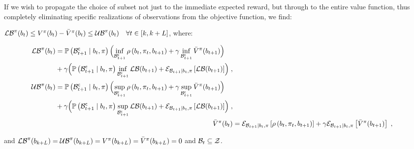If we wish to propagate the choice of subset not just to the immediate expected reward, but through to the entire value function, thus completely eliminating specific realizations of observations from the objective function, we find:
\begin{corollaryE}
	\label{thm:val_func_bounds_obs_bellman}
	$\lowerbound^\pi(\blf{t})\leq V^\pi(\blf{t})-\bar{V}^\pi(\blf{t})\leq\upperbound^\pi(\blf{t})\quad\forall t\in[k,k+L]$, where:
	\begin{small}
		\begin{subequations}
			\begin{align}
				\begin{split}
					\lowerbound\nolimits^\pi(\blf{t})&=\measure{\stcompI{\subSpace}{t+1}\mid\blf{t},\pi}\Bigl(\inf_{\stcompI{\subSpace}{t+1}}\reward{\blf{t},\pi_t,\blf{t+1}}+\gamma\inf_{\stcompI{\subSpace}{t+1}}\bar{V}^\pi(\blf{t+1})\Bigr)\\
					&+
					\gamma\Bigl(\measure{\stcompI{\subSpace}{t+1}\mid\blf{t},\pi}\inf_{\stcompI{\subSpace}{t+1}}\lowerbound(\blf{t+1})+\partialexpectation{\lowerbound(\blf{t+1})}{\subSpaceI{t+1}\mid\blf{t},\pi}\Bigr)\;,
				\end{split}\\
				\begin{split}
					\upperbound\nolimits^\pi(\blf{t})&=\measure{\stcompI{\subSpace}{t+1}\mid\blf{t},\pi}\Bigl(\sup_{\stcompI{\subSpace}{t+1}}\reward{\blf{t},\pi_t,\blf{t+1}}+\gamma\sup_{\stcompI{\subSpace}{t+1}}\bar{V}^\pi(\blf{t+1})\Bigr)\\
					&+
					\gamma\Bigl(\measure{\stcompI{\subSpace}{t+1}\mid\blf{t},\pi}\sup_{\stcompI{\subSpace}{t+1}}\lowerbound(\blf{t+1})+\partialexpectation{\lowerbound(\blf{t+1})}{\subSpaceI{t+1}\mid\blf{t},\pi}\Bigr)\;,
				\end{split}\\
				\bar{V}^\pi(\blf{t}) &=\partialexpectation{\reward{\blf{t},\pi_t,\blf{t+1}}}{\subSpaceI{t+1}\mid\blf{t},\pi}+\gamma\partialexpectation{\bar{V}^\pi(\blf{t+1})}{\subSpaceI{t+1}\mid\blf{t},\pi}\;,
			\end{align}
		\end{subequations}
	\end{small}
	and $\lowerbound^\pi(\blf{k+L})=\upperbound^\pi(\blf{k+L})=V^\pi(\blf{k+L})=\bar{V}^\pi(\blf{k+L})=0$ and $\subSpaceI{t}\subseteq\observationSpace$.
\end{corollaryE}
